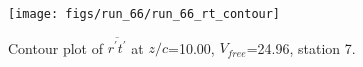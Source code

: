 \begin{figure}[H]
\centering
\texttt{[image: figs/run\_66/run\_66\_rt\_contour]}
\caption{Contour plot of $\overline{r^\prime t^\prime}$ at $z/c$=10.00, $V_{free}$=24.96, station 7.}
\label{fig:run_66_rt_contour}
\end{figure}


